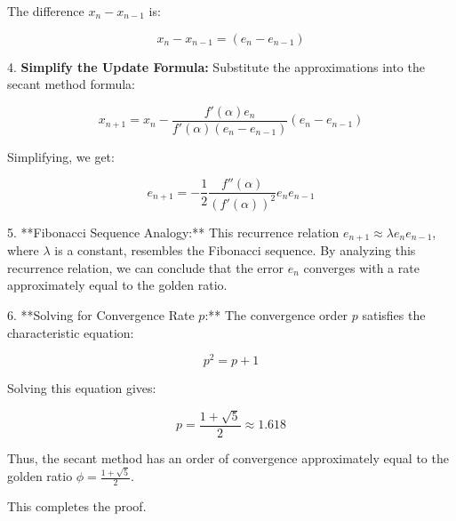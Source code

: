 \documentclass[12pt]{article}
\begin{document}
\begin{itemize}
    The difference \( x_n - x_{n-1} \) is:
    
    \[
    x_n - x_{n-1} = (e_n - e_{n-1})
    \]
    
    4. \textbf{Simplify the Update Formula:} Substitute the approximations into the secant method formula:
    
    \[
    x_{n+1} = x_n - \frac{f'(\alpha)e_n}{f'(\alpha)(e_n - e_{n-1})} (e_n - e_{n-1})
    \]
    
    Simplifying, we get:
    
    \[
    e_{n+1} = - \frac{1}{2} \frac{f''(\alpha)}{(f'(\alpha))^2} e_n e_{n-1}
    \]
    
    5. **Fibonacci Sequence Analogy:** This recurrence relation \( e_{n+1} \approx \lambda e_n e_{n-1} \), where \( \lambda \) is a constant, resembles the Fibonacci sequence. By analyzing this recurrence relation, we can conclude that the error \( e_n \) converges with a rate approximately equal to the golden ratio.
    
    6. **Solving for Convergence Rate \( p \):** The convergence order \( p \) satisfies the characteristic equation:
    
    \[
    p^2 = p + 1
    \]
    
    Solving this equation gives:
    
    \[
    p = \frac{1 + \sqrt{5}}{2} \approx 1.618
    \]
    
    Thus, the secant method has an order of convergence approximately equal to the golden ratio \( \phi = \frac{1 + \sqrt{5}}{2} \).
\end{itemize}

This completes the proof.
\end{document}
